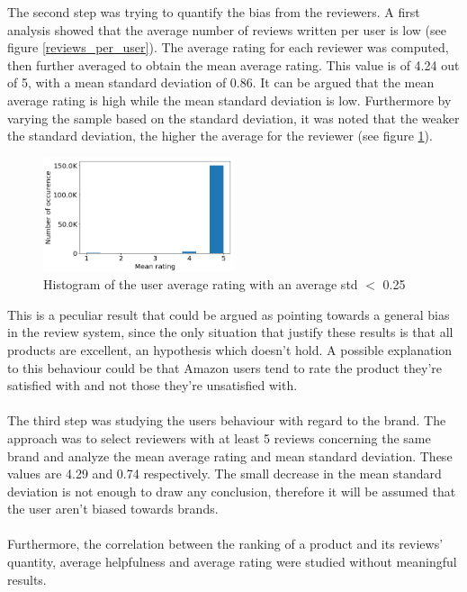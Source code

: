 \documentclass[11pt]{article}
\begin{document}
The second step was trying to quantify the bias from the reviewers. A first analysis showed that the average number of reviews written per user is low (see figure \ref{reviews_per_user}). The average rating for each reviewer was computed, then further averaged to obtain the mean average rating. This value is of 4.24 out of 5, with a mean standard deviation of 0.86. It can be argued that the mean average rating is high while the mean standard deviation is low. Furthermore by varying the sample based on the standard deviation, it was noted that the weaker the standard deviation, the higher the average for the reviewer (see figure \ref{rating_users_std_025}).
\begin{figure}[h]
\includegraphics[width=0.5\textwidth]{rating_std025.png}
\caption{Histogram of the user average rating with an average std $<$ 0.25}
\label{rating_users_std_025}
\end{figure}

This is a peculiar result that could be argued as pointing towards a general bias in the review system, since the only situation that justify these results is that all products are excellent, an hypothesis which doesn't hold. A possible explanation to this behaviour could be that Amazon users  tend to rate the product they're satisfied with and not those they're unsatisfied with.\\\\
The third step was studying the users behaviour with regard to the brand. The approach was to select reviewers with at least 5 reviews concerning the same brand and analyze the mean average rating and mean standard deviation. These values are 4.29 and 0.74 respectively. The small decrease in the mean standard deviation is not enough to draw any conclusion, therefore it will be assumed that the user aren't biased towards brands.\\\\
Furthermore, the correlation between the ranking of a product and its reviews' quantity, average helpfulness and average rating were studied without meaningful results.
\end{document}
